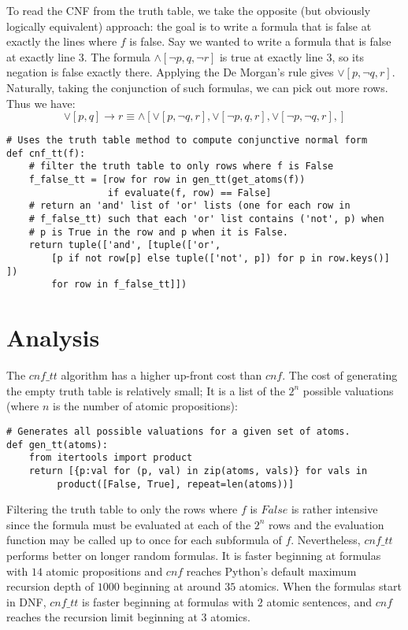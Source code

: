 \documentclass[a4paper,notitlepage]{scrartcl}
\begin{document}
To read the CNF from the truth table, we take the opposite (but obviously
        logically equivalent) approach: the goal is to write a formula
        that is false at exactly the lines where $f$ is false. 
Say we wanted to write a formula that is false at exactly line $3$.
The formula $\land[\lnot p, q, \lnot r]$ is true at exactly line $3$, so its
        negation is false exactly there.
Applying the De Morgan's rule gives $\lor[p, \lnot q, r]$.
Naturally, taking the conjunction of such formulas, we can pick out more rows.
Thus we have:
\[
\lor[p,q]\rightarrow r \equiv 
\land[
\lor[p, \lnot q, r], 
\lor[\lnot p, q, r], 
\lor[\lnot p, \lnot q, r], 
     ]
\]

\begin{verbatim}
# Uses the truth table method to compute conjunctive normal form
def cnf_tt(f):
    # filter the truth table to only rows where f is False 
    f_false_tt = [row for row in gen_tt(get_atoms(f)) 
                  if evaluate(f, row) == False]
    # return an 'and' list of 'or' lists (one for each row in
    # f_false_tt) such that each 'or' list contains ('not', p) when
    # p is True in the row and p when it is False.
    return tuple(['and', [tuple(['or', 
        [p if not row[p] else tuple(['not', p]) for p in row.keys()] ]) 
        for row in f_false_tt]])
\end{verbatim}

\section{Analysis}

The $cnf\_tt$ algorithm has a higher up-front cost than $cnf$.
The cost of generating the empty truth table is relatively small; 
It is a list of the $2^n$ possible valuations (where $n$ is the
        number of atomic propositions):
\begin{verbatim}
# Generates all possible valuations for a given set of atoms.     
def gen_tt(atoms):
    from itertools import product
    return [{p:val for (p, val) in zip(atoms, vals)} for vals in 
         product([False, True], repeat=len(atoms))]
\end{verbatim}
Filtering the truth table to only the rows where $f$ is $False$ is rather
        intensive since the formula must be evaluated at each of the
        $2^n$ rows and the evaluation function may be called up to once
        for each subformula of $f$.
Nevertheless, $cnf\_tt$ performs better on longer random formulas.
It is faster beginning at formulas with $14$ atomic propositions and 
        $cnf$ reaches Python's default maximum recursion depth of $1000$
        beginning at around $35$ atomics. 
When the formulas start in DNF, $cnf\_tt$ is faster beginning at formulas
        with $2$ atomic sentences, and $cnf$ reaches the recursion limit
        beginning at $3$ atomics.
\end{document}
